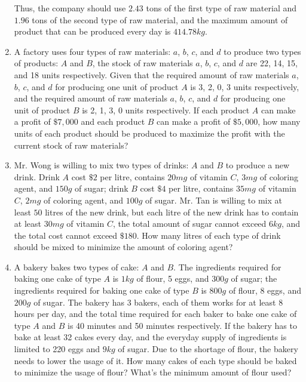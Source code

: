 \documentclass{report}
\begin{document}
\begin{multicols}{2}
\begin{enumerate}
              Thus, the company should use $2.43$ tons of the first type of raw material and
              $1.96$ tons of the second type of raw material, and the maximum amount of
              product that can be produced every day is $414.78 kg$.

        \item A factory uses four types of raw materials: $a$, $b$, $c$, and $d$ to produce
              two types of products: $A$ and $B$, the stock of raw materials $a$, $b$, $c$,
              and $d$ are 22, 14, 15, and 18 units respectively. Given that the required
              amount of raw materials $a$, $b$, $c$, and $d$ for producing one unit of
              product $A$ is 3, 2, 0, 3 units respectively, and the required amount of raw
              materials $a$, $b$, $c$, and $d$ for producing one unit of product $B$ is 2, 1,
              3, 0 units respectively. If each product $A$ can make a profit of $\$7,000$ and
              each product $B$ can make a profit of $\$5,000$, how many units of each product
              should be produced to maximize the profit with the current stock of raw
              materials?
        \item Mr. Wong is willing to mix two types of drinks: $A$ and $B$ to produce a new
              drink. Drink $A$ cost $\$2$ per litre, contains $20mg$ of vitamin $C$, $3mg$ of
              coloring agent, and $150g$ of sugar; drink $B$ cost $\$4$ per litre, contains
              $35mg$ of vitamin $C$, $2mg$ of coloring agent, and $100g$ of sugar. Mr. Tan is
              willing to mix at least $50$ litres of the new drink, but each litre of the new
              drink has to contain at least $30mg$ of vitamin $C$, the total amount of sugar
              cannot exceed $6kg$, and the total cost cannot exceed $\$180$. How many litres
              of each type of drink should be mixed to minimize the amount of coloring agent?

        \item A bakery bakes two types of cake: $A$ and $B$. The ingredients required for
              baking one cake of type $A$ is $1kg$ of flour, 5 eggs, and $300g$ of sugar; the
              ingredients required for baking one cake of type $B$ is $800g$ of flour, 8
              eggs, and $200g$ of sugar. The bakery has 3 bakers, each of them works for at
              least 8 hours per day, and the total time required for each baker to bake one
              cake of type $A$ and $B$ is 40 minutes and 50 minutes respectively. If the
              bakery has to bake at least 32 cakes every day, and the everyday supply of
              ingredients is limited to 220 eggs and $9kg$ of sugar. Due to the shortage of
              flour, the bakery needs to lower the usage of it. How many cakes of each type
              should be baked to minimize the usage of flour? What's the minimum amount of
              flour used?
    \end{enumerate}


\end{multicols}
\end{document}
